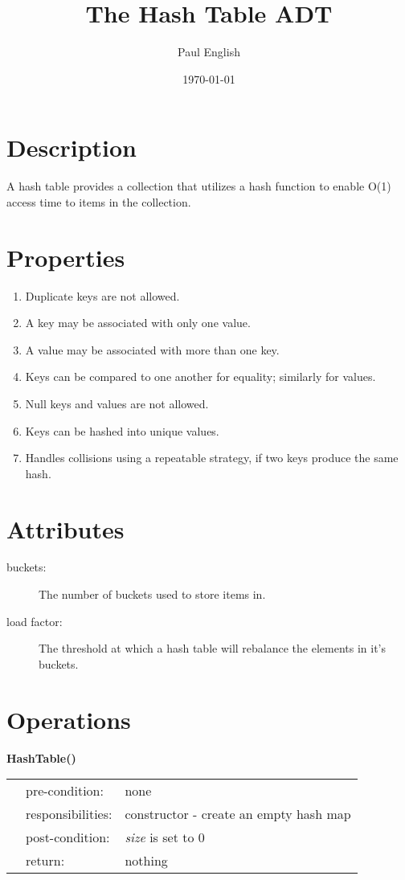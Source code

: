 \documentclass[12pt,letterpaper]{article}
\title{The Hash Table ADT}
\date{\today}
\author{Paul English}
\begin{document}
\maketitle

\section*{Description}

A hash table provides a collection that utilizes a hash function to enable O(1) access time to items in the collection.

\section*{Properties}

\begin{enumerate}

\item Duplicate keys are not allowed.
\item A key may be associated with only one value.
\item A value may be associated with more than one key.
\item Keys can be compared to one another for equality; similarly for values.
\item Null keys and values are not allowed.
\item Keys can be hashed into unique values.
\item Handles collisions using a repeatable strategy, if two keys produce the same hash.

\end{enumerate}

\section*{Attributes}

\begin{description}
\item[buckets:] The number of buckets used to store items in.
\item[load factor:] The threshold at which a hash table will rebalance the elements in it's buckets.
\end{description}

\section*{Operations}

\textbf{HashTable()} \\
\begin{listliketab} 
        \begin{tabular}{Lll}
            & pre-condition:    & none \\
            & responsibilities: & constructor - create an empty hash map \\
            & post-condition:   & \emph{size} is set to 0 \\
            & return:           & nothing
        \end{tabular} 
\end{listliketab}
    
\end{document}
